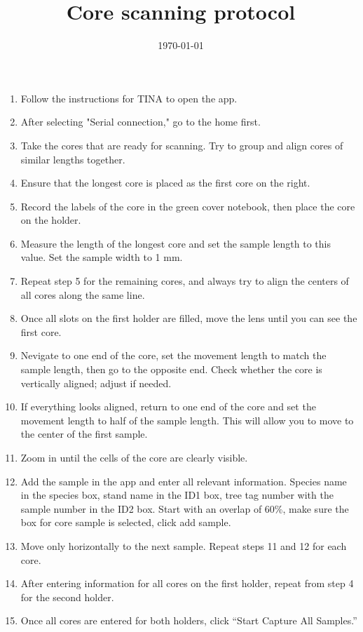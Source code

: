 \documentclass[11pt,letter]{article}
\begin{document}
\title{Core scanning protocol} 
\date{\today}
\maketitle

\setlength{\parindent}{0pt}
\setlength{\parskip}{3pt}
\begin{enumerate}
\item Follow the instructions for TINA to open the app.
\item After selecting "Serial connection," go to the home first.
\item Take the cores that are ready for scanning. Try to group and align cores of similar lengths together.
\item Ensure that the longest core is placed as the first core on the right.
\item Record the labels of the core in the green cover notebook, then place the core on the holder.
\item Measure the length of the longest core and set the sample length to this value. Set the sample width to 1 mm.
\item Repeat step 5 for the remaining cores, and always try to align the centers of all cores along the same line.
\item Once all slots on the first holder are filled, move the lens until you can see the first core.
\item Nevigate to one end of the core, set the movement length to match the sample length, then go to the opposite end. Check whether the core is vertically aligned; adjust if needed.
\item If everything looks aligned, return to one end of the core and set the movement length to half of the sample length. This will allow you to move to the center of the first sample.
\item Zoom in until the cells of the core are clearly visible.
\item Add the sample in the app and enter all relevant information. Species name in the species box, stand name in the ID1 box, tree tag number with the sample number in the ID2 box. Start with an overlap of 60\%, make sure the box for core sample is selected, click add sample.
\item Move only horizontally to the next sample. Repeat steps 11 and 12 for each core.
\item After entering information for all cores on the first holder, repeat from step 4 for the second holder.
\item Once all cores are entered for both holders, click “Start Capture All Samples.”

\end{enumerate}
\end{document}

